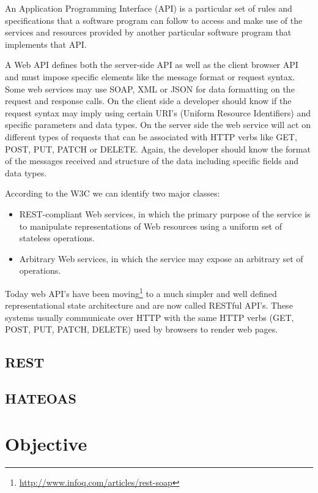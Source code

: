 An Application Programming Interface (API) is a particular
set of rules and specifications that a software program can follow to access and make use of the services
and resources provided by another particular software program that implements that API.

A Web API defines both the server-side API as well as the client browser API and must impose specific elements like the message format or request syntax. Some web services may use SOAP, XML or JSON for data formatting on the request and response calls. On the client side a developer should know if the request syntax may imply using certain URI's (Uniform Resource Identifiers) and specific parameters and data types. On the server side the web service will act on different types of requests that can be associated with HTTP verbs like GET, POST, PUT, PATCH or DELETE. Again, the developer should know the format of the messages received and structure of the data including specific fields and data types.

According to the W3C \cite{W3C} we can identify two major classes:
\begin{itemize}
\item REST-compliant Web services, in which the primary purpose of the service is to manipulate representations of Web resources using a uniform set of stateless operations.
\item Arbitrary Web services, in which the service may expose an arbitrary set of operations. 
\end{itemize}

Today web API's have been moving\footnote{\url{http://www.infoq.com/articles/rest-soap}} to a much simpler and well defined representational state architecture and are now called RESTful API's. These systems usually communicate over HTTP with the same HTTP verbs (GET, POST, PUT, PATCH, DELETE) used by browsers to render web pages.

\subsection{REST}
\label{sub-sec:rest}



\subsection{HATEOAS}
\label{sub-sec:hateoas}



\section{Objective}
\label{sec:objective}

